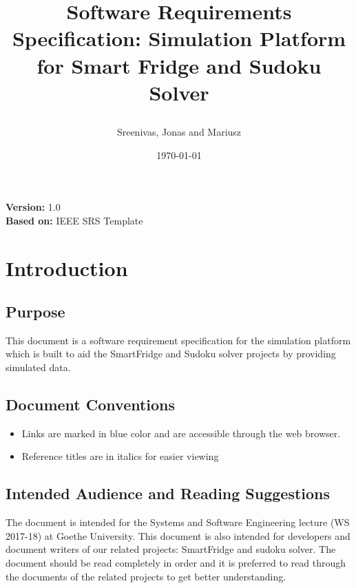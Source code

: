 \documentclass[a4paper,12pt]{article}
\begin{document}



\title{\begin{Huge}
\textbf{Software Requirements Specification: Simulation Platform for Smart Fridge and Sudoku Solver}
\end{Huge}}
\author{\begin{Large}
Sreenivas, Jonas and Mariusz
\end{Large}}
\date{\today}
\maketitle
\thispagestyle{empty}
\begin{center}
\begin{large}
\textbf{Version:} 1.0
\\  \textbf{Based on:} IEEE SRS Template
\end{large}
\end{center}
\newpage
\tableofcontents \newpage
{}
\section{Introduction}
\subsection{Purpose}
This document is a software requirement specification for the simulation platform which is built to aid the SmartFridge and Sudoku solver projects by providing simulated data.
\subsection{Document Conventions}
\begin{itemize}
\item Links are marked in blue color and are accessible through the web browser.
\item Reference titles are in italics for easier viewing
\end{itemize}
\subsection{Intended Audience and Reading Suggestions}
The document is intended for the Systems and Software Engineering lecture (WS 2017-18) at Goethe University. This document is also intended for developers and document writers of our related projects: SmartFridge and sudoku solver. The document should be read completely in order and it is preferred to read through the documents of the related projects to get better understanding.
\end{document}
